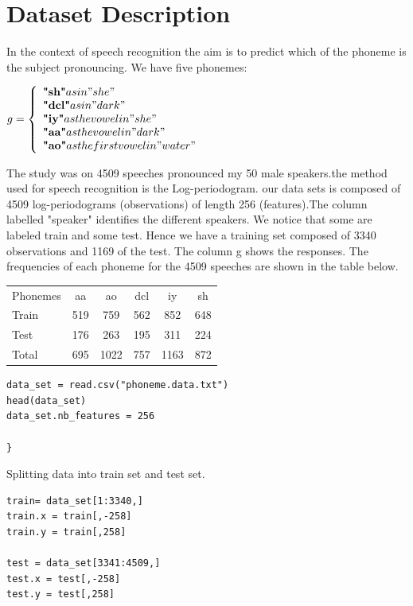 \documentclass[]{report}
\begin{document}
\section{Dataset Description}
In the context of speech recognition the aim is to predict which of the phoneme is the subject pronouncing. We have five phonemes:\\ 
\begin{center}
	$g = \left\{
	\begin{array}{l}
	\textbf{"sh"} as in "she" \\
	\textbf{"dcl"} as in "dark" \\
	\textbf{"iy"} as the vowel in "she" \\ 
	\textbf{"aa"} as the vowel in "dark"\\
	\textbf{"ao"} as the first vowel in "water"
	\end{array}
	\right.$
\end{center}
The study was on 4509 speeches pronounced my 50 male speakers.the method used for speech recognition is the Log-periodogram. our data sets is composed of 4509 log-periodograms (observations) of length 256 (features).The column labelled "speaker" identifies the
different speakers. We notice that some are labeled train and some test. Hence we have a training set composed of 3340 observations and 1169 of the test. The column g shows the responses. The frequencies of each phoneme for the 4509 speeches are shown in the table below.

\begin{center}
\begin{tabular}{l c c c c c}
 Phonemes	 & aa &  ao & dcl & iy & sh \\
Train & 519 & 759 & 562 & 852 & 648\\
Test  & 176 & 263 & 195 & 311 & 224\\
Total & 695 & 1022 & 757 & 1163 & 872
\end{tabular}
\end{center}

\begin{lstlisting}
data_set = read.csv("phoneme.data.txt")
head(data_set)
data_set.nb_features = 256

}
\end{lstlisting}

Splitting data into train set and test set.
\begin{lstlisting}
train= data_set[1:3340,]
train.x = train[,-258]
train.y = train[,258]

test = data_set[3341:4509,]
test.x = test[,-258]
test.y = test[,258]
\end{lstlisting}
\end{document}
